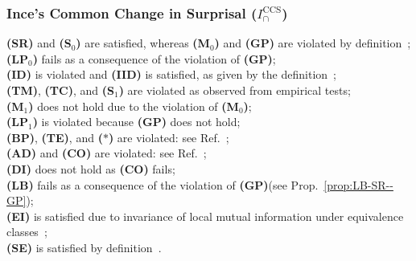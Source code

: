 \documentclass{article}
\newcommand{\ts}[1]{\ensuremath{_{\text{#1}}}}
\newcommand{\SR}{\textbf{(SR)}\xspace} %
\newcommand{\Sz}{\textbf{(S\ts{0})}\xspace} %
\newcommand{\Mz}{\textbf{(M\ts{0})}\xspace} %
\newcommand{\GP}{\textbf{(GP)}\xspace} %
\newcommand{\LPz}{\textbf{(LP\ts{0})}\xspace} %
\newcommand{\ID}{\textbf{(ID)}\xspace} %
\newcommand{\IID}{\textbf{(IID)}\xspace} %
\newcommand{\TM}{\textbf{(TM)}\xspace} %
\newcommand{\TC}{\textbf{(TC)}\xspace} %
\newcommand{\So}{\textbf{(S\ts{1})}\xspace} %
\newcommand{\Mo}{\textbf{(M\ts{1})}\xspace} %
\newcommand{\LPo}{\textbf{(LP\ts{1})}\xspace} %
\newcommand{\BP}{\textbf{(BP)}\xspace} %
\newcommand{\TE}{\textbf{(TE)}\xspace} %
\newcommand{\AST}{\textbf{($\boldsymbol{\ast}$)}\xspace} %
\newcommand{\AD}{\textbf{(AD)}\xspace} %
\newcommand{\CO}{\textbf{(CO)}\xspace} %
\newcommand{\LB}{\textbf{(LB)}\xspace} %
\newcommand{\EI}{\textbf{(EI)}\xspace} %
\newcommand{\SE}{\textbf{(SE)}\xspace} %
\newcommand{\DI}{\textbf{(DI)}\xspace}
\newcommand{\ICCS}{\ensuremath{I_\cap^{\text{CCS}}}\xspace}
\begin{document}
\subsubsection*{Ince's Common Change in Surprisal ($\ICCS$)}
    \SR and \Sz are satisfied, whereas \Mz and \GP are violated by definition~\cite{ince2017measuring}; \\
    \LPz fails as a consequence of the violation of \GP; \\
    \ID is violated and \IID is satisfied, as given by the definition~\cite{ince2017measuring}; \\
    \TM, \TC, and \So are violated as observed from empirical tests; \\
    \Mo does not hold due to the violation of \Mz; \\
    \LPo is violated because \GP does not hold; \\
    \BP, \TE, and \AST are violated: see Ref.~\cite{kolchinsky2022novel}; \\
    \AD and \CO are violated: see Ref.~\cite{rauh2023continuity}; \\
    \DI does not hold as \CO fails; \\
    \LB fails as a consequence of the violation of \GP (see Prop.~\ref{prop:LB-SR--GP}); \\
    \EI is satisfied due to invariance of local mutual information under equivalence classes~\cite{li2011connection}; \\
    \SE is satisfied by definition~\cite{ince2017measuring}.
\end{document}
